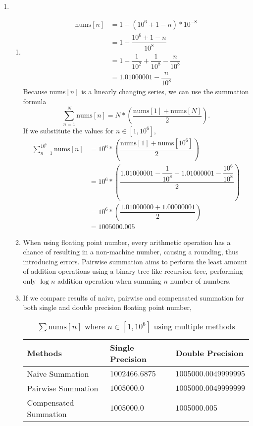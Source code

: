 \documentclass[10pt,a4paper, margin=1in]{article}
\begin{document}
\begin{enumerate}
	\item %
    \begin{enumerate}
    	\item %
    	\begin{align*}
    		\text{nums}[n] &= 1+(10^6+1-n)*10^{-8}\\
    		&= 1+\dfrac{10^6+1-n}{10^8}\\
    		&= 1+\dfrac{1}{10^2}+\dfrac{1}{10^8}-\dfrac{n}{10^8}\\
    		&= 1.01000001 - \dfrac{n}{10^8}
    	\end{align*}
    	Because nums$[n]$ is a linearly changing series, we can use the summation formula 
    	$$\sum_{n=1}^N\text{nums}[n] = N*\left( \dfrac{\text{nums}[1]+\text{nums}[N]}{2} \right) .$$ If we substitute the values for $n\in[1, 10^6],$
    	\begin{align*}
    		\sum_{n=1}^{10^6}\text{nums}[n] &= 10^6*\left( \dfrac{\text{nums}[1]+\text{nums}[10^6]}{2} \right)\\
    		&= 10^6*\left( \dfrac{1.01000001 - \dfrac{1}{10^8}+1.01000001 - \dfrac{10^6}{10^8}}{2} \right)\\
    		&= 10^6*\left( \dfrac{1.01000000 + 1.00000001}{2} \right)\\
    		&= 1005000.005
    	\end{align*}
    	\item %
    	When using floating point number, every arithmetic operation has a chance of resulting in a non-machine number, causing a rounding, thus introducing errors. Pairwise summation aims to perform the least amount of addition operations using a binary tree like recursion tree, performing only $ \log n$ addition operation when summing $n$ number of numbers.
    	\item %
    	If we compare results of naive, pairwise and compensated summation for both single and double precision floating point number, 
    	\begin{table} [H]
    		\centering
			\caption{$\sum \text{nums}[n]$ where $n\in[1, 10^6]$ using multiple methods}
			\label{tab:Q2.1}
			\begin{tabular}{l|l|l}
				
				Methods & Single Precision & Double Precision\\
				\hline \hline
				Naive Summation & $1002466.6875$ & $1005000.0049999995$ \\
				\hline
				Pairwise Summation & $ 1005000.0$ & $1005000.0049999999 $\\
				\hline
				Compensated Summation & $ 1005000.0$ & $1005000.005$ \\
			\end{tabular}
		\end{table}
    	

\end{enumerate}
\end{enumerate}
\end{document}
